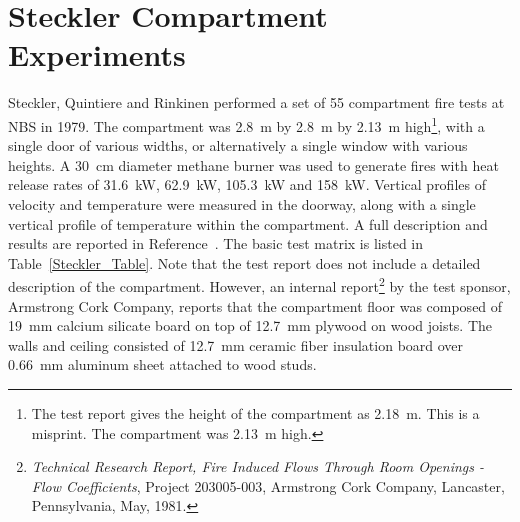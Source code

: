 \section{Steckler Compartment Experiments}

Steckler, Quintiere and Rinkinen performed a set of 55 compartment fire tests at NBS in 1979. The compartment was 2.8~m by 2.8~m by 2.13~m high\footnote{The test report
gives the height of the compartment as 2.18~m. This is a misprint. The compartment was 2.13~m high.}, with a single door of
various widths, or alternatively a single window with various heights. A 30~cm diameter methane burner was used to generate fires with heat release rates of
31.6~kW, 62.9~kW, 105.3~kW and 158~kW. Vertical profiles of velocity and temperature were measured in the doorway, along with a single vertical profile of temperature
within the compartment.
A full description and results are reported in Reference~\cite{Steckler:NBSIR_82-2520}. The basic test matrix is listed in Table~\ref{Steckler_Table}. Note that the
test report does not include a detailed description of the compartment. However, an internal report\footnote{ {\em Technical Research Report, Fire Induced Flows
Through Room Openings - Flow Coefficients}, Project 203005-003, Armstrong Cork Company, Lancaster, Pennsylvania, May, 1981.} by the test sponsor, Armstrong Cork Company,
reports that the compartment floor was composed of 19~mm calcium silicate board on top of 12.7~mm plywood on wood joists. The walls and ceiling consisted of
12.7~mm ceramic fiber insulation board over 0.66~mm aluminum sheet attached to wood studs.

